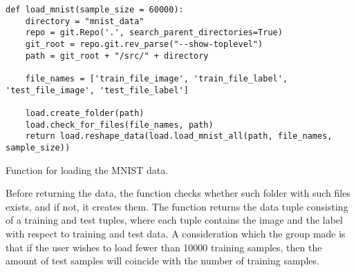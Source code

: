 \begin{listing}[!ht]
\begin{verbatim}
def load_mnist(sample_size = 60000):
    directory = "mnist_data"
    repo = git.Repo('.', search_parent_directories=True)
    git_root = repo.git.rev_parse("--show-toplevel")
    path = git_root + "/src/" + directory
        
    file_names = ['train_file_image', 'train_file_label', 'test_file_image', 'test_file_label']
        
    load.create_folder(path)
    load.check_for_files(file_names, path)
    return load.reshape_data(load.load_mnist_all(path, file_names, sample_size))
\end{verbatim}
\caption{Function for loading the MNIST data.}
\label{lst:load-mist}
\end{listing}

Before returning the data, the function checks whether such folder with such files exists, and if not, it creates them. The function returns the data tuple consisting of a training and test tuples, where each tuple contains the image and the label with respect to training and test data. A consideration which the group made is that if the user wishes to load fewer than 10000 training samples, then the amount of test samples will coincide with the number of training samples.
